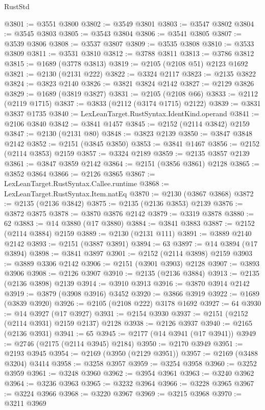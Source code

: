\begin{lexlean}{RustStd}
\begin{coremodule}
@3801 := @3551 @3800
@3802 := @3549 @3801
@3803 := @3547 @3802
@3804 := @3545 @3803
@3805 := @3543 @3804
@3806 := @3541 @3805
@3807 := @3539 @3806
@3808 := @3537 @3807
@3809 := @3535 @3808
@3810 := @3533 @3809
@3811 := @3531 @3810
@3812 := @3788 @3811
@3813 := @3786 @3812
@3815 := @1689 (@3778 @3813)
@3819 := @2105 (@2108 @51) @2123 @1692
@3821 := @2130 (@2131 @222)
@3822 := @3324 @2117
@3823 := @2135 @3822
@3824 := @3823 @2140
@3826 := @3821 @3824 @2142
@3827 := @2129 @3826
@3829 := @1689 (@3819 @3827)
@3831 := @2105 (@2108 @66)
@3833 := @2112 (@2119 @1715)
@3837 := @3833 (@2112 (@3174 @1715) @2122)
@3839 := @3831 @3837 @1735
@3840 := LexLeanTarget.RustSyntax.IdentKind.operand
@3841 := @2106 @3840
@3842 := @3841 @1457
@3845 := @2152 (@2114 @3842) @2159
@3847 := @2130 (@2131 @80)
@3848 := @3823 @2139
@3850 := @3847 @3848 @2142
@3852 := @2151 (@3845 @3850)
@3853 := @3841 @1467
@3856 := @2152 (@2114 @3853) @2159
@3857 := @3324 @2189
@3859 := @2135 @3857 @2139
@3861 := @3847 @3859 @2142
@3864 := @2151 (@3856 @3861) @2128
@3865 := @3852 @3864
@3866 := @2126 @3865
@3867 := LexLeanTarget.RustSyntax.Callee.runtime
@3868 := LexLeanTarget.RustSyntax.Item.natEq
@3870 := @2130 (@3867 @3868)
@3872 := @2135 (@2136 @3842)
@3875 := @2135 (@2136 @3853) @2139
@3876 := @3872 @3875
@3878 := @3870 @3876 @2142
@3879 := @3319 @3878
@3880 := 62
@3883 := @14 @3880 (@17 @3880)
@3884 := @3841 @3883
@3887 := @2152 (@2114 @3884) @2159
@3889 := @2130 (@2131 @111)
@3891 := @3889 @2140 @2142
@3893 := @2151 (@3887 @3891)
@3894 := 63
@3897 := @14 @3894 (@17 @3894)
@3898 := @3841 @3897
@3901 := @2152 (@2114 @3898) @2159
@3903 := @3889 @3306 @2142
@3906 := @2151 (@3901 @3903) @2128
@3907 := @3893 @3906
@3908 := @2126 @3907
@3910 := @2135 (@2136 @3884)
@3913 := @2135 (@2136 @3898) @2139
@3914 := @3910 @3913
@3916 := @3870 @3914 @2142
@3919 := @3879 (@3908 @3916) @3452
@3920 := @3866 @3919
@3922 := @1689 (@3839 @3920)
@3926 := @2105 (@2108 @222) @3178 @1692
@3927 := 64
@3930 := @14 @3927 (@17 @3927)
@3931 := @2154 @3930
@3937 := @2151 (@2152 (@2114 @3931) @2159 @2137) @2128
@3938 := @2126 @3937
@3940 := @2165 (@2136 @3931)
@3941 := 65
@3945 := @2177 (@14 @3941 (@17 @3941))
@3949 := @2746 (@2175 (@2114 @3945) @2184)
@3950 := @2170 @3949
@3951 := @2193 @3945
@3954 := @2169 (@3950 (@2129 @3951))
@3957 := @2169 (@3488 @3204) @3414
@3958 := @3258 @3957
@3959 := @3254 @3958
@3960 := @3252 @3959
@3961 := @3248 @3960
@3962 := @3954 @3961
@3963 := @3240 @3962
@3964 := @3236 @3963
@3965 := @3232 @3964
@3966 := @3228 @3965
@3967 := @3224 @3966
@3968 := @3220 @3967
@3969 := @3215 @3968
@3970 := @3211 @3969

\end{coremodule}
\end{lexlean}

